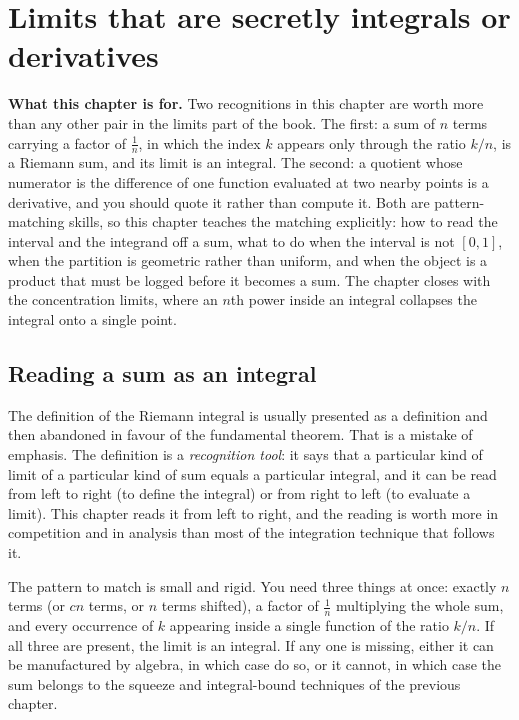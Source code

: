 \chapter{Limits that are secretly integrals or derivatives}

\begin{orient}
\textbf{What this chapter is for.} Two recognitions in this chapter are worth more than any other pair in the limits part of the book. The first: a sum of $n$ terms carrying a factor of $\tfrac1n$, in which the index $k$ appears only through the ratio $k/n$, is a Riemann sum, and its limit is an integral. The second: a quotient whose numerator is the difference of one function evaluated at two nearby points is a derivative, and you should quote it rather than compute it. Both are pattern-matching skills, so this chapter teaches the matching explicitly: how to read the interval and the integrand off a sum, what to do when the interval is not $[0,1]$, when the partition is geometric rather than uniform, and when the object is a product that must be logged before it becomes a sum. The chapter closes with the concentration limits, where an $n$th power inside an integral collapses the integral onto a single point.
\end{orient}

\section{Reading a sum as an integral}

The definition of the Riemann integral is usually presented as a definition and then abandoned in favour of the fundamental theorem. That is a mistake of emphasis. The definition is a \emph{recognition tool}: it says that a particular kind of limit of a particular kind of sum equals a particular integral, and it can be read from left to right (to define the integral) or from right to left (to evaluate a limit). This chapter reads it from left to right, and the reading is worth more in competition and in analysis than most of the integration technique that follows it.

The pattern to match is small and rigid. You need three things at once: exactly $n$ terms (or $cn$ terms, or $n$ terms shifted), a factor of $\tfrac1n$ multiplying the whole sum, and every occurrence of $k$ appearing inside a single function of the ratio $k/n$. If all three are present, the limit is an integral. If any one is missing, either it can be manufactured by algebra, in which case do so, or it cannot, in which case the sum belongs to the squeeze and integral-bound techniques of the previous chapter.

